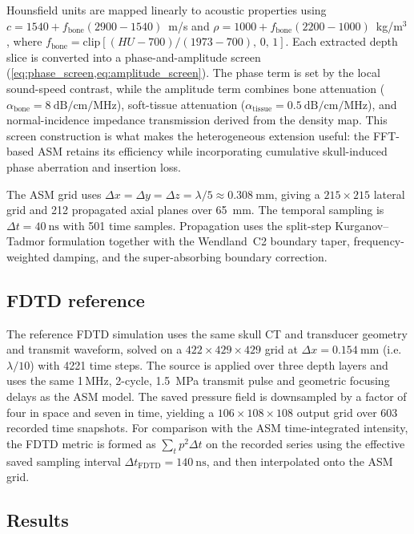 \documentclass[11pt]{article}
\begin{document}
Hounsfield units are mapped linearly to acoustic properties using
$c = 1540 + f_{\mathrm{bone}}(2900 - 1540)$~m/s and
$\rho = 1000 + f_{\mathrm{bone}}(2200 - 1000)$~kg/m$^3$, where
$f_{\mathrm{bone}} = \mathrm{clip}[(HU - 700)/(1973 - 700),\,0,\,1]$.
Each extracted depth slice is converted into a phase-and-amplitude
screen (\cref{eq:phase_screen,eq:amplitude_screen}).  The phase term is
set by the local sound-speed contrast, while the amplitude term combines
bone attenuation
($\alpha_{\mathrm{bone}} = \SI{8}{\dB\per\cm\per\MHz}$),
soft-tissue attenuation
($\alpha_{\mathrm{tissue}} = \SI{0.5}{\dB\per\cm\per\MHz}$), and
normal-incidence impedance transmission derived from the density map.
This screen construction is what makes the heterogeneous extension
useful: the FFT-based ASM retains its efficiency while incorporating
cumulative skull-induced phase aberration and insertion loss.

The ASM grid uses
$\Delta x = \Delta y = \Delta z = \lambda/5 \approx \SI{0.308}{\milli\meter}$,
giving a $215 \times 215$ lateral grid and 212 propagated axial planes
over \SI{65}{\milli\meter}.  The temporal sampling is
$\Delta t = \SI{40}{\nano\second}$ with 501 time samples.  Propagation
uses the split-step Kurganov--Tadmor formulation together with the
Wendland~C2 boundary taper, frequency-weighted damping, and the
super-absorbing boundary correction.

\subsection{FDTD reference}
\label{sec:transcranial:fdtd}

The reference FDTD simulation \cite{pinton2014} uses the same skull CT
and transducer geometry and transmit waveform, solved on a
$422 \times 429 \times 429$ grid at
$\Delta x = \SI{0.154}{\milli\meter}$ (i.e.\ $\lambda/10$) with 4221
time steps.  The source is applied over three depth layers and uses the
same 1\,MHz, 2-cycle, \SI{1.5}{\mega\pascal} transmit pulse and
geometric focusing delays as the ASM model.  The saved pressure field
is downsampled by a factor of four in space and seven in time, yielding
a $106 \times 108 \times 108$ output grid over 603 recorded time
snapshots.  For comparison with the ASM time-integrated intensity, the
FDTD metric is formed as $\sum_t p^2 \Delta t$ on the recorded series
using the effective saved sampling interval
$\Delta t_{\mathrm{FDTD}} = \SI{140}{\nano\second}$, and then
interpolated onto the ASM grid.

\subsection{Results}
\label{sec:transcranial:results}
\end{document}
